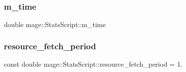 \hypertarget{classmage_1_1_stats_script_a69972949fb34f0368e9437a254a79643}{}\label{classmage_1_1_stats_script_a69972949fb34f0368e9437a254a79643} 
\subsubsection{\texorpdfstring{m\+\_\+time}{m\_time}}
{\footnotesize\ttfamily double mage\+::\+Stats\+Script\+::m\+\_\+time\hspace{0.3cm}{\ttfamily [private]}}

\hypertarget{classmage_1_1_stats_script_acae1ac4fd880389c88818a8f72cbff2b}{}\label{classmage_1_1_stats_script_acae1ac4fd880389c88818a8f72cbff2b} 
\subsubsection{\texorpdfstring{resource\+\_\+fetch\+\_\+period}{resource\_fetch\_period}}
{\footnotesize\ttfamily const double mage\+::\+Stats\+Script\+::resource\+\_\+fetch\+\_\+period = 1.\hspace{0.3cm}{\ttfamily [static]}}

